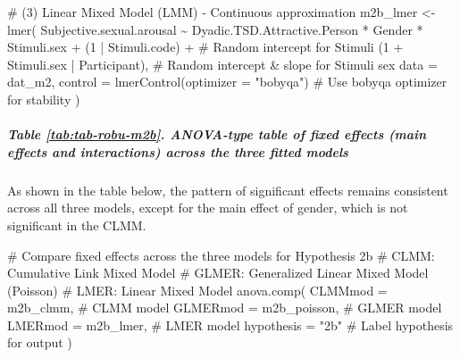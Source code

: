\documentclass[
  bookmarksnumbered]{article}
\newenvironment{Shaded}{\begin{snugshade}}{\end{snugshade}}
\newcommand{\AttributeTok}[1]{\textcolor[rgb]{0.80,0.80,0.80}{#1}}
\newcommand{\CommentTok}[1]{\textcolor[rgb]{0.50,0.62,0.50}{#1}}
\newcommand{\DecValTok}[1]{\textcolor[rgb]{0.86,0.86,0.80}{#1}}
\newcommand{\FunctionTok}[1]{\textcolor[rgb]{0.94,0.94,0.56}{#1}}
\newcommand{\NormalTok}[1]{\textcolor[rgb]{0.80,0.80,0.80}{#1}}
\newcommand{\OtherTok}[1]{\textcolor[rgb]{0.94,0.94,0.56}{#1}}
\newcommand{\SpecialCharTok}[1]{\textcolor[rgb]{0.86,0.64,0.64}{#1}}
\newcommand{\StringTok}[1]{\textcolor[rgb]{0.80,0.58,0.58}{#1}}
\begin{document}
\begin{Shaded}
\begin{Highlighting}[]
\CommentTok{\# (3) Linear Mixed Model (LMM) {-} Continuous approximation}
\NormalTok{m2b\_lmer }\OtherTok{\textless{}{-}} \FunctionTok{lmer}\NormalTok{(}
\NormalTok{  Subjective.sexual.arousal }\SpecialCharTok{\textasciitilde{}}\NormalTok{ Dyadic.TSD.Attractive.Person }\SpecialCharTok{*}\NormalTok{ Gender }\SpecialCharTok{*}\NormalTok{ Stimuli.sex }\SpecialCharTok{+}
\NormalTok{    (}\DecValTok{1} \SpecialCharTok{|}\NormalTok{ Stimuli.code) }\SpecialCharTok{+} \CommentTok{\# Random intercept for Stimuli}
\NormalTok{    (}\DecValTok{1} \SpecialCharTok{+}\NormalTok{ Stimuli.sex }\SpecialCharTok{|}\NormalTok{ Participant), }\CommentTok{\# Random intercept \& slope for Stimuli sex}
  \AttributeTok{data =}\NormalTok{ dat\_m2,}
  \AttributeTok{control =} \FunctionTok{lmerControl}\NormalTok{(}\AttributeTok{optimizer =} \StringTok{"bobyqa"}\NormalTok{) }\CommentTok{\# Use \textquotesingle{}bobyqa\textquotesingle{} optimizer for stability}
\NormalTok{)}
\end{Highlighting}
\end{Shaded}

\subparagraph{Table \ref{tab:tab-robu-m2b}. ANOVA-type table of fixed effects (main effects and interactions) across the three fitted models}\label{table-reftabtab-robu-m2b.-anova-type-table-of-fixed-effects-main-effects-and-interactions-across-the-three-fitted-models}

As shown in the table below, the pattern of significant effects remains consistent across all three models, except for the main effect of gender, which is not significant in the CLMM.

\begin{Shaded}
\begin{Highlighting}[]
\CommentTok{\# Compare fixed effects across the three models for Hypothesis 2b}
\CommentTok{\# CLMM: Cumulative Link Mixed Model}
\CommentTok{\# GLMER: Generalized Linear Mixed Model (Poisson)}
\CommentTok{\# LMER: Linear Mixed Model}
\FunctionTok{anova.comp}\NormalTok{(}
  \AttributeTok{CLMMmod =}\NormalTok{ m2b\_clmm, }\CommentTok{\# CLMM model}
  \AttributeTok{GLMERmod =}\NormalTok{ m2b\_poisson, }\CommentTok{\# GLMER model}
  \AttributeTok{LMERmod =}\NormalTok{ m2b\_lmer, }\CommentTok{\# LMER model}
  \AttributeTok{hypothesis =} \StringTok{"2b"} \CommentTok{\# Label hypothesis for output}
\NormalTok{)}
\end{Highlighting}
\end{Shaded}
\end{document}
